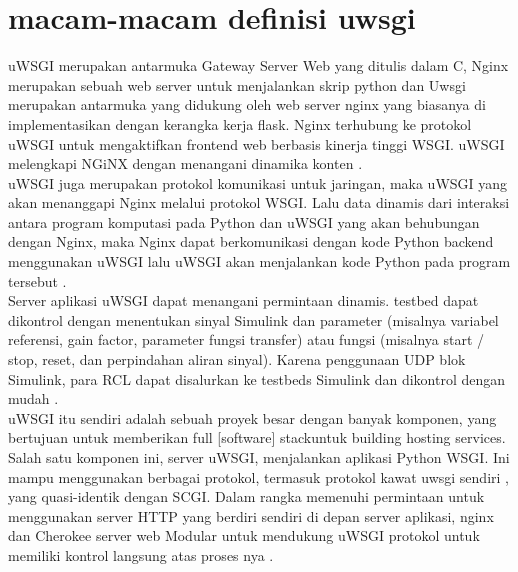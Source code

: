 
\section{macam-macam definisi uwsgi}
 	uWSGI merupakan antarmuka Gateway Server Web yang ditulis dalam C, Nginx merupakan sebuah web server untuk menjalankan skrip python dan Uwsgi merupakan antarmuka yang didukung oleh web server nginx yang biasanya di implementasikan dengan kerangka kerja flask. Nginx terhubung ke protokol uWSGI untuk mengaktifkan frontend web berbasis kinerja tinggi WSGI. uWSGI melengkapi NGiNX dengan menangani dinamika konten \cite{balaji2013sentinel}.\\
	
	uWSGI juga merupakan protokol komunikasi untuk jaringan, maka uWSGI yang akan menanggapi Nginx melalui protokol WSGI. Lalu data dinamis dari interaksi antara program komputasi pada Python dan uWSGI yang akan behubungan dengan Nginx, maka Nginx dapat berkomunikasi dengan kode Python backend menggunakan uWSGI lalu uWSGI akan menjalankan kode Python pada program tersebut \cite{hirschbergreal}.\\
	
	Server aplikasi uWSGI dapat menangani permintaan dinamis. testbed dapat dikontrol dengan menentukan sinyal Simulink dan parameter (misalnya variabel referensi, gain factor, parameter fungsi transfer) atau fungsi (misalnya start / stop, reset, dan perpindahan aliran sinyal). Karena penggunaan UDP blok Simulink, para RCL dapat disalurkan ke testbeds Simulink dan dikontrol dengan mudah \cite{zumsandedesign}.\\
	
	uWSGI itu sendiri adalah sebuah proyek besar dengan banyak komponen, yang bertujuan untuk memberikan full [software] stackuntuk building hosting services. Salah satu komponen ini, server uWSGI, menjalankan aplikasi Python WSGI. Ini mampu menggunakan berbagai protokol, termasuk protokol kawat uwsgi sendiri , yang quasi-identik dengan SCGI. Dalam rangka memenuhi permintaan untuk menggunakan server HTTP yang berdiri sendiri di depan server aplikasi, nginx dan Cherokee server web Modular untuk mendukung uWSGI protokol untuk memiliki kontrol langsung atas proses nya \cite{dong2015chemdes}.\\

